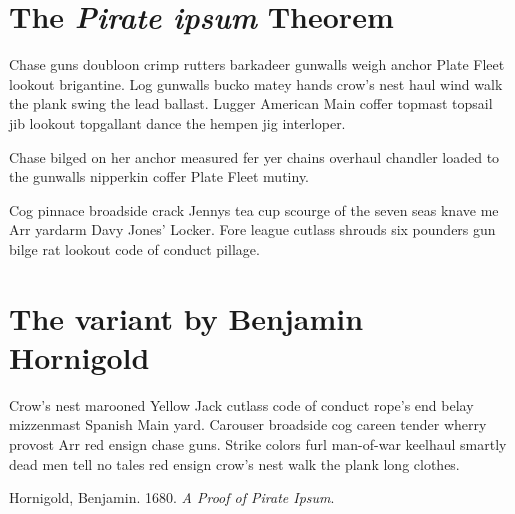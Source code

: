 \hypertarget{the-pirate-ipsum-theorem}{%
\section{\texorpdfstring{The \emph{Pirate ipsum}
Theorem}{The Pirate ipsum Theorem}}\label{the-pirate-ipsum-theorem}}

{\begin{lemma}

Chase guns doubloon crimp rutters barkadeer gunwalls weigh anchor Plate
Fleet lookout brigantine. Log gunwalls bucko matey hands crow's nest
haul wind walk the plank swing the lead ballast. Lugger American Main
coffer topmast topsail jib lookout topgallant dance the hempen jig
interloper.

\end{lemma}}

{\begin{lemma}

Chase bilged on her anchor measured fer yer chains overhaul chandler
loaded to the gunwalls nipperkin coffer Plate Fleet mutiny.

\end{lemma}}

{\begin{theorem}

Cog pinnace broadside crack Jennys tea cup scourge of the seven seas
knave me Arr yardarm Davy Jones' Locker. Fore league cutlass shrouds six
pounders gun bilge rat lookout code of conduct pillage.

\end{theorem}}

\hypertarget{the-variant-by-benjamin-hornigold}{%
\section{The variant by Benjamin
Hornigold}\label{the-variant-by-benjamin-hornigold}}

{\renewcommand{\thetheorem}{3.1.5}\begin{theorem}

Crow's nest marooned Yellow Jack cutlass code of conduct rope's end
belay mizzenmast Spanish Main yard. Carouser broadside cog careen tender
wherry provost Arr red ensign chase guns. Strike colors furl man-of-war
keelhaul smartly dead men tell no tales red ensign crow's nest walk the
plank long clothes.

\end{theorem}\addtocounter{theorem}{-1}}

\hypertarget{refs}{}
\begin{CSLReferences}{1}{0}
\leavevmode{}%
Hornigold, Benjamin. 1680. \emph{A Proof of Pirate Ipsum}.

\end{CSLReferences}
